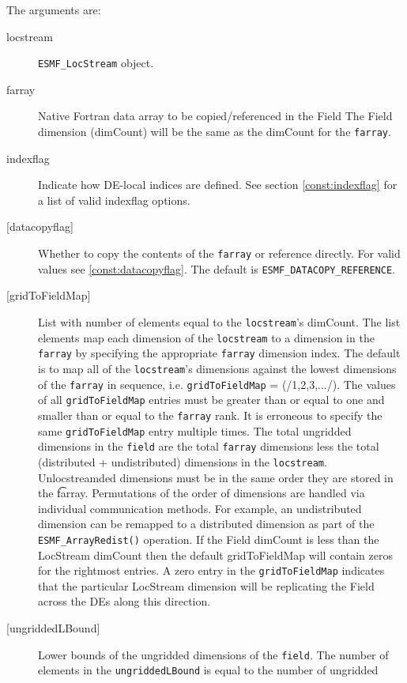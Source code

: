   The arguments are: 
   \begin{description} 
   \item [locstream] 
   {\tt ESMF\_LocStream} object. 
   \item [farray] 
   Native Fortran data array to be copied/referenced in the Field 
   The Field dimension (dimCount) will be the same as the dimCount 
   for the {\tt farray}. 
   \item[indexflag] 
   Indicate how DE-local indices are defined. See section 
   \ref{const:indexflag} for a list of valid indexflag options. 
   \item [{[datacopyflag]}] 
   Whether to copy the contents of the {\tt farray} or reference directly. 
   For valid values see \ref{const:datacopyflag}. The default is 
   {\tt ESMF\_DATACOPY\_REFERENCE}. 
   \item [{[gridToFieldMap]}] 
   List with number of elements equal to the 
   {\tt locstream}'s dimCount. The list elements map each dimension 
   of the {\tt locstream} to a dimension in the {\tt farray} by 
   specifying the appropriate {\tt farray} dimension index. The default is to 
   map all of the {\tt locstream}'s dimensions against the lowest dimensions of 
   the {\tt farray} in sequence, i.e. {\tt gridToFieldMap} = (/1,2,3,.../). 
   The values of all {\tt gridToFieldMap} entries must be greater than or equal 
   to one and smaller than or equal to the {\tt farray} rank. 
   It is erroneous to specify the same {\tt gridToFieldMap} entry 
   multiple times. The total ungridded dimensions in the {\tt field} 
   are the total {\tt farray} dimensions less 
   the total (distributed + undistributed) dimensions in 
   the {\tt locstream}. Unlocstreamded dimensions must be in the same order they are 
   stored in the {\t farray}. Permutations of the order of 
   dimensions are handled via individual communication methods. For example, 
   an undistributed dimension can be remapped to a distributed dimension 
   as part of the {\tt ESMF\_ArrayRedist()} operation. 
   If the Field dimCount is less than the LocStream dimCount then the default 
   gridToFieldMap will contain zeros for the rightmost entries. A zero 
   entry in the {\tt gridToFieldMap} indicates that the particular 
   LocStream dimension will be replicating the Field across the DEs along 
   this direction. 
   \item [{[ungriddedLBound]}] 
   Lower bounds of the ungridded dimensions of the {\tt field}. 
   The number of elements in the {\tt ungriddedLBound} is equal to the number of ungridded 

\end{description}
